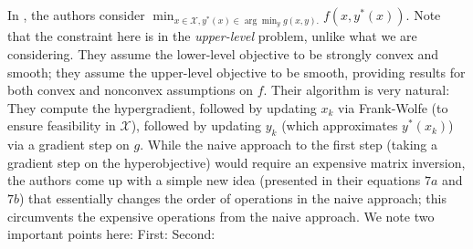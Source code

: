 In \cite{abolfazli2023inexact}, the authors consider $\min_{x\in \mathcal{X}, y^\ast(x)\in \arg\min_y g(x,y).} f(x, y^\ast(x))$. Note that the constraint here is in the \emph{upper-level} problem, unlike what we are considering. They assume the lower-level objective to be strongly convex and smooth; they assume the upper-level objective to be smooth, providing results for both convex and nonconvex assumptions on $f$. 
Their algorithm is very natural: They compute the hypergradient, followed by updating $x_k$ via Frank-Wolfe (to ensure feasibility in $\mathcal{X}$), followed by updating $y_k$ (which approximates $y^\ast(x_k)$) via a gradient step on $g$. While the naive approach to the first step (taking a gradient step on the hyperobjective) would require an expensive matrix inversion, the authors come up with a simple new idea (presented in their equations $7a$ and $7b$) that essentially changes the order of operations in the naive approach; this circumvents the expensive operations from the naive approach. We note two important points here: First:  Second:  